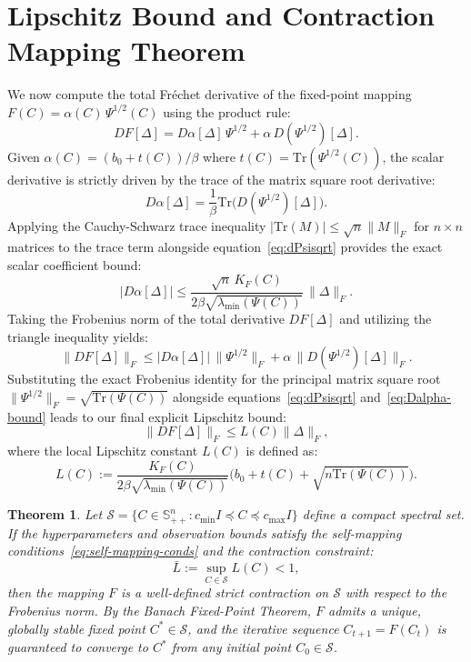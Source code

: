 \documentclass[11pt,a4paper]{article}
\newtheorem{theorem}{Theorem}
\begin{document}
\section{Lipschitz Bound and Contraction Mapping Theorem}
We now compute the total Fr\'echet derivative of the fixed-point mapping $F(C) = \alpha(C)\,\Psi^{1/2}(C)$ using the product rule:
\begin{equation}
DF[\Delta] = D\alpha[\Delta]\,\Psi^{1/2} + \alpha\,D(\Psi^{1/2})[\Delta].
\end{equation}
Given $\alpha(C) = (b_0+t(C))/\beta$ where $t(C) = \text{Tr}(\Psi^{1/2}(C))$, the scalar derivative is strictly driven by the trace of the matrix square root derivative:
\begin{equation}
D\alpha[\Delta] = \frac{1}{\beta}\text{Tr}\big(D(\Psi^{1/2})[\Delta]\big).
\end{equation}
Applying the Cauchy-Schwarz trace inequality $|\text{Tr}(M)| \le \sqrt{n}\|M\|_F$ for $n \times n$ matrices to the trace term alongside equation~\eqref{eq:dPsisqrt} provides the exact scalar coefficient bound:
\begin{equation}\label{eq:Dalpha-bound}
|D\alpha[\Delta]| \le \frac{\sqrt{n}\,K_F(C)}{2\beta\sqrt{\lambda_{\min}(\Psi(C))}}\,\|\Delta\|_F.
\end{equation}
Taking the Frobenius norm of the total derivative $DF[\Delta]$ and utilizing the triangle inequality yields:
\begin{equation}
\|DF[\Delta]\|_F \le |D\alpha[\Delta]|\,\|\Psi^{1/2}\|_F + \alpha\,\|D(\Psi^{1/2})[\Delta]\|_F.
\end{equation}
Substituting the exact Frobenius identity for the principal matrix square root $\|\Psi^{1/2}\|_F = \sqrt{\text{Tr}(\Psi(C))}$ alongside equations~\eqref{eq:dPsisqrt} and~\eqref{eq:Dalpha-bound} leads to our final explicit Lipschitz bound:
\begin{equation}\label{eq:L-bound}
\|DF[\Delta]\|_F \le L(C)\|\Delta\|_F,
\end{equation}
where the local Lipschitz constant $L(C)$ is defined as:
\begin{equation}
L(C) := \frac{K_F(C)}{2\beta\sqrt{\lambda_{\min}(\Psi(C))}}\Big( b_0 + t(C) + \sqrt{n \text{Tr}(\Psi(C))} \Big).
\end{equation}

\begin{theorem}
Let $\mathcal{S} = \{C \in \mathbb{S}_{++}^n : c_{\min}I \preceq C \preceq c_{\max}I\}$ define a compact spectral set. If the hyperparameters and observation bounds satisfy the self-mapping conditions~\eqref{eq:self-mapping-conds} and the contraction constraint:
\begin{equation}
\bar{L} := \sup_{C \in \mathcal{S}} L(C) < 1,
\end{equation}
then the mapping $F$ is a well-defined strict contraction on $\mathcal{S}$ with respect to the Frobenius norm. By the Banach Fixed-Point Theorem, $F$ admits a unique, globally stable fixed point $C^* \in \mathcal{S}$, and the iterative sequence $C_{t+1} = F(C_t)$ is guaranteed to converge to $C^*$ from any initial point $C_0 \in \mathcal{S}$.
\end{theorem}
\end{document}
